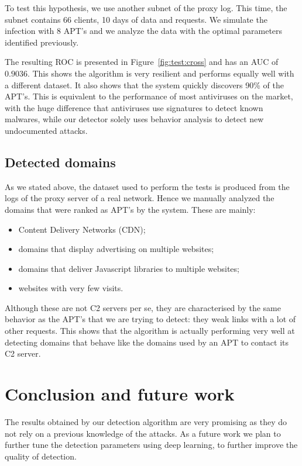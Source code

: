 \documentclass[conference]{IEEEtran}
\begin{document}
To test this hypothesis, we use another subnet of the proxy log. This time, the subnet contains 66 clients, 10 days of data and  requests. We simulate the infection with 8 APT's and we analyze the data with the optimal parameters identified previously.

The resulting ROC is presented in Figure~\ref{fig:test:cross} and has an AUC of $0.9036$. This shows the algorithm is very resilient and performs equally well with a different dataset. It also shows that the system quickly discovers 90\% of the APT's. This is equivalent to the performance of most antiviruses on the market, with the huge difference that antiviruses use signatures to detect known malwares, while our detector solely uses behavior analysis to detect new undocumented attacks.

\subsection{Detected domains}

As we stated above, the dataset used to perform the tests is produced from the logs of the proxy server of a real network. Hence we manually analyzed the domains that were ranked as APT's by the system. These are mainly:

\begin{itemize}
  \item Content Delivery Networks (CDN);
  \item domains that display advertising on multiple websites;
  \item domains that deliver Javascript libraries to multiple websites;
  \item websites with very few visits.
\end{itemize}

Although these are not C2 servers per se, they are characterised by the same behavior as the APT's that we are trying to detect: they weak links with a lot of other requests. This shows that the algorithm is actually performing very well at detecting domains that behave like the domains used by an APT to contact its C2 server.

\section{Conclusion and future work}
\label{sec:conclusion}

The results obtained by our detection algorithm are very promising as they do not rely on a previous knowledge of the attacks. As a future work we plan to further tune the detection parameters using deep learning, to further improve the quality of detection.
\end{document}
